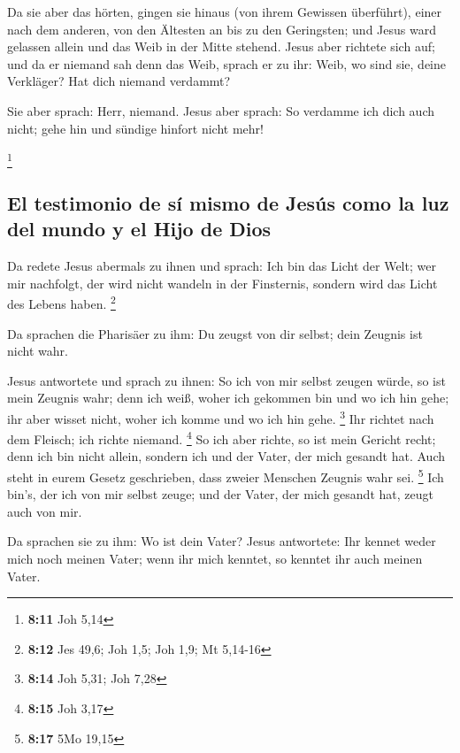  Da sie aber das hörten, gingen sie hinaus (von ihrem
Gewissen überführt), einer nach dem anderen, von den Ältesten an bis zu
den Geringsten; und Jesus ward gelassen allein und das Weib in der Mitte
stehend.  Jesus aber richtete sich auf; und da er niemand
sah denn das Weib, sprach er zu ihr: Weib, wo sind sie, deine Verkläger?
Hat dich niemand verdammt?

 Sie aber sprach: Herr, niemand. Jesus aber sprach: So
verdamme ich dich auch nicht; gehe hin und sündige hinfort nicht mehr!

\footnote{\textbf{8:11} Joh 5,14}

\hypertarget{el-testimonio-de-suxed-mismo-de-jesuxfas-como-la-luz-del-mundo-y-el-hijo-de-dios}{%
\subsection{El testimonio de sí mismo de Jesús como la luz del mundo y
el Hijo de
Dios}\label{el-testimonio-de-suxed-mismo-de-jesuxfas-como-la-luz-del-mundo-y-el-hijo-de-dios}}

 Da redete Jesus abermals zu ihnen und sprach: Ich bin
das Licht der Welt; wer mir nachfolgt, der wird nicht wandeln in der
Finsternis, sondern wird das Licht des Lebens haben. \footnote{\textbf{8:12}
  Jes 49,6; Joh 1,5; Joh 1,9; Mt 5,14-16}

 Da sprachen die Pharisäer zu ihm: Du zeugst von dir
selbst; dein Zeugnis ist nicht wahr.

 Jesus antwortete und sprach zu ihnen: So ich von mir
selbst zeugen würde, so ist mein Zeugnis wahr; denn ich weiß, woher ich
gekommen bin und wo ich hin gehe; ihr aber wisset nicht, woher ich komme
und wo ich hin gehe. \footnote{\textbf{8:14} Joh 5,31; Joh 7,28}
 Ihr richtet nach dem Fleisch; ich richte niemand.
\footnote{\textbf{8:15} Joh 3,17}  So ich aber richte, so
ist mein Gericht recht; denn ich bin nicht allein, sondern ich und der
Vater, der mich gesandt hat.  Auch steht in eurem Gesetz
geschrieben, dass zweier Menschen Zeugnis wahr sei. \footnote{\textbf{8:17}
  5Mo 19,15}  Ich bin's, der ich von mir selbst zeuge;
und der Vater, der mich gesandt hat, zeugt auch von mir.

 Da sprachen sie zu ihm: Wo ist dein Vater? Jesus
antwortete: Ihr kennet weder mich noch meinen Vater; wenn ihr mich
kenntet, so kenntet ihr auch meinen Vater.

